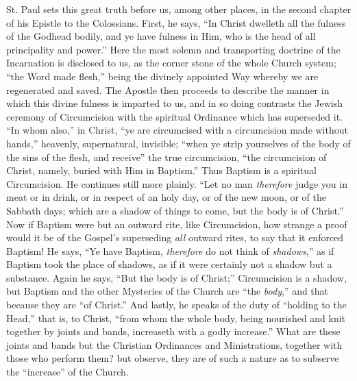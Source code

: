 St. Paul sets this great truth before us, among other places, in
the second chapter of his Epistle to the Colossians. First, he says,
``In Christ dwelleth all the fulness of the Godhead bodily, and
ye have fulness in Him, who is the head of all principality and
power.'' Here the most solemn and transporting doctrine of the
Incarnation is disclosed to us, as the corner stone of the whole
Church system; ``the Word made flesh,'' being the divinely
appointed Way whereby we are regenerated and saved. The Apostle then
proceeds to describe the manner in which this divine fulness is
imparted to us, and in so doing contrasts the Jewish ceremony of
Circumcision with the spiritual Ordinance which has superseded it.
``In whom also,'' in Christ, ``ye are circumcised with a
circumcision made without hands,'' heavenly, supernatural,
invisible; ``when ye strip yourselves of the body of the sins of
the flesh, and receive'' the true circumcision, ``the
circumcision of Christ, namely, buried with Him in Baptism.'' Thus
Baptism is a spiritual Circumcision. He continues still more plainly.
``Let no man \emph{therefore} judge you in meat or in drink, or in
respect of an holy day, or of the new moon, or of the Sabbath days;
which are a shadow of things to come, but the body is of Christ.''
Now if Baptism were but an outward rite, like Circumcision, how
strange a proof would it be of the Gospel's superseding \emph{all}
outward rites, to say that it enforced Baptism! He says, ``Ye have
Baptism, \emph{therefore} do not think of \emph{shadows},'' as if
Baptism took the place of shadows, as if it were certainly not a
shadow but a substance. Again he says, ``But the body is of
Christ;'' Circumcision is a shadow, but Baptism and the other
Mysteries of the Church are ``the \emph{body},'' and that
because they are ``of Christ.'' And lastly, he speaks of the
duty of ``holding to the Head,'' that is, to Christ,
``from whom the whole body, being nourished and knit together by
joints and bands, increaseth with a godly increase.'' What are these
joints and bands but the Christian Ordinances and Ministrations,
together with those who perform them? but observe, they are of such a
nature as to subserve the ``increase'' of the Church.

